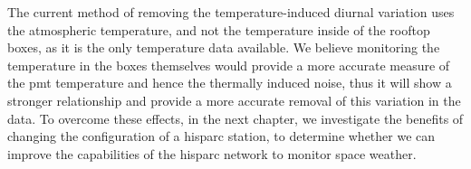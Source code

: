 The current method of removing the temperature-induced diurnal variation uses the atmospheric temperature, and not the temperature inside of the rooftop boxes, as it is the only temperature data available. We believe monitoring the temperature in the boxes themselves would provide a more accurate measure of the \gls{pmt} temperature and hence the thermally induced noise, thus it will show a stronger relationship and provide a more accurate removal of this variation in the data. To overcome these effects, in the next chapter, we investigate the benefits of changing the configuration of a \gls{hisparc} station, to determine whether we can improve the capabilities of the \gls{hisparc} network to monitor space weather.